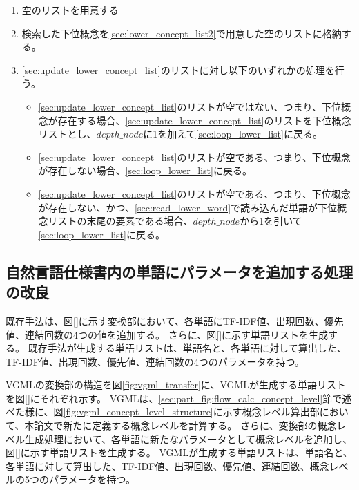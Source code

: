 \begin{enumerate}
\begin{enumerate}
\begin{enumerate}
                    \item 空のリストを用意する
                    \label{sec:lower_concept_list2}
                    \item 検索した下位概念を\ref{sec:lower_concept_list2}で用意した空のリストに格納する。
                    \label{sec:update_lower_concept_list}
                    \item \ref{sec:update_lower_concept_list}のリストに対し以下のいずれかの処理を行う。
                    \begin{itemize}
                        \item \ref{sec:update_lower_concept_list}のリストが空ではない、つまり、下位概念が存在する場合、\ref{sec:update_lower_concept_list}のリストを下位概念リストとし、$depth\_node$に1を加えて\ref{sec:loop_lower_list}に戻る。
                        \item \ref{sec:update_lower_concept_list}のリストが空である、つまり、下位概念が存在しない場合、\ref{sec:loop_lower_list}に戻る。
                        \item \ref{sec:update_lower_concept_list}のリストが空である、つまり、下位概念が存在しない、かつ、\ref{sec:read_lower_word}で読み込んだ単語が下位概念リストの末尾の要素である場合、$depth\_node$から1を引いて\ref{sec:loop_lower_list}に戻る。
                    \end{itemize}
                \end{enumerate}
        \end{enumerate}
\end{enumerate}

\subsection{自然言語仕様書内の単語にパラメータを追加する処理の改良}
\label{sec:improve_word_list}
既存手法は、図\ref{}に示す変換部において、各単語にTF-IDF値、出現回数、優先値、連結回数の4つの値を追加する。
さらに、図\ref{}に示す単語リストを生成する。
既存手法が生成する単語リストは、単語名と、各単語に対して算出した、TF-IDF値、出現回数、優先値、連結回数の4つのパラメータを持つ。

VGMLの変換部の構造を図\ref{fig:vgml_transfer}に、VGMLが生成する単語リストを図\ref{}にそれぞれ示す。
VGMLは、\ref{sec:part_fig:flow_calc_concept_level}節で述べた様に、図\ref{fig:vgml_concept_level_structure}に示す概念レベル算出部において、本論文で新たに定義する概念レベルを計算する。
さらに、変換部の概念レベル生成処理において、各単語に新たなパラメータとして概念レベルを追加し、図\ref{}に示す単語リストを生成する。
VGMLが生成する単語リストは、単語名と、各単語に対して算出した、TF-IDF値、出現回数、優先値、連結回数、概念レベルの5つのパラメータを持つ。

